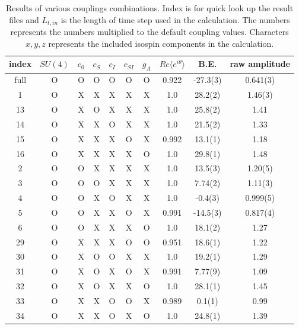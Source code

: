 \documentclass[10pt]{book}
\def\la{\langle}
\def\ra{\rangle}
\begin{document}
\begin{table}
\caption{Results of various couplings combinations.
Index is for quick look up the result files and
$L_{t,in}$ is the length of time step used in the calculation. 
The numbers represents the numbers multiplied to the default
coupling values. Characters $x,y,z$ represents
the included isospin components in the calculation.
}
\label{tbl:signphase:he4}
\begin{center} 
\begin{tabular}{c|cccccc|ccc}
index  & $SU(4)$&$c_0$&$c_S$&$c_I$&$c_{SI}$&$g_A$& 
                        $ Re \la e^{i\theta}\ra$ & B.E. & raw amplitude\\ \hline 
full &  O &   O &  O  & O   & O      & O   & 0.922&  -27.3(3) &  0.641(3)\\                         
 1   &  O &   X & X   & X   & X      & X   & 1.0 & 28.2(2) & 1.46(3) \\
13   &  O &   X & O   & X   & X      & X   & 1.0  & 25.8(2) &  1.41\\
14   &  O &   X & X   & O   & X      & X   &  1.0 &  21.5(2)& 1.33 \\
15   &  O &   X & X   & X   & O      & X   & 0.992 & 13.1(1) & 1.18 \\
16   &  O &   X & X   & X   & X      & O   &  1.0   &   29.8(1)  & 1.48 \\
 2   &  O &   O & X   & X   & X      & X   & 1.0 & 13.5(3) & 1.20(5) \\
 3   &  O &   O & O   & X   & X      & X   & 1.0 & 7.74(2) & 1.11(3)\\
 4   &  O &   O & X   & O   & X      & X   & 1.0 & -0.4(3)  & 0.999(5) \\
 5   &  O &   O & X   & X   & O      & X   & 0.991 & -14.5(3) & 0.817(4) \\ 
 6   &  O &   O & X   & X   & X      & O   & 1.0 & 18.1(2) & 1.27 \\
29  &  O &   X & X   & X   & O      & O   & 0.951 & 18.6(1) & 1.22\\  
30  &  O &   X & O   & O   & X      & X   & 1.0   & 19.2(1) & 1.29\\
31  &  O &   X & O   & X   & O      & X   & 0.991 & 7.77(9) & 1.09\\
32  &  O &   X & O   & X   & X      & O   & 1.0   & 28.1(1) & 1.45\\
33  &  O &   X & X   & O   & O      & X   & 0.989 & 0.1(1)  & 0.99\\
34  &  O &   X & X   & O   & X      & O   & 1.0   & 24.8(1) & 1.39\\

\end{tabular}
\end{center}
\end{table}
\end{document}
